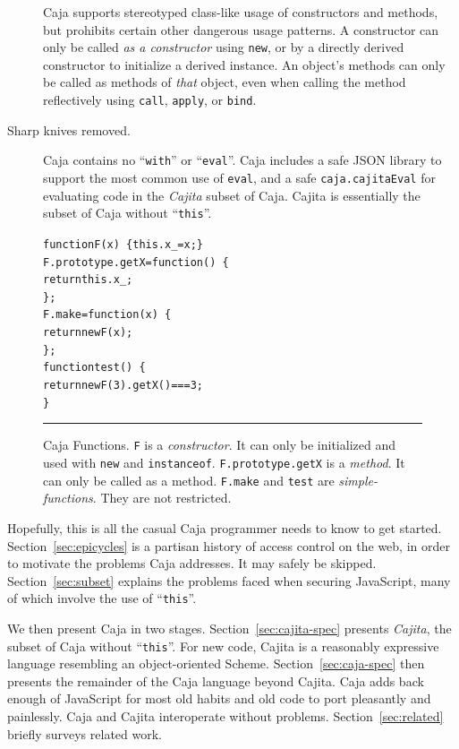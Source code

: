 \documentclass[letterpaper,twocolumn,10pt]{article}
\newcommand{\code}[1]{{\tt {#1}}}              %
\begin{document}
\begin{description}
  Caja supports stereotyped class-like usage of constructors and methods, but 
  prohibits certain other dangerous usage patterns. A constructor can only be 
  called \emph{as a constructor} using \code{new}, or by a directly derived 
  constructor to initialize a derived instance. An object's methods can only 
  be called as methods of \emph{that} object, even when calling the method 
  reflectively using \code{call}, \code{apply}, or \code{bind}.
 
  \item[Sharp knives removed.] Caja contains no ``\code{with}'' or 
  ``\code{eval}''. Caja includes a safe JSON library to support the most 
  common use of \code{eval}, and a safe \code{caja.cajitaEval} for evaluating code 
  in the \emph{Cajita} subset of Caja. Cajita is essentially the subset of 
  Caja without ``\code{this}''.
 
\end{description}

\begin{figure}[t!]
\begin{alltt}
function F(x)\ \{ this.x_ = x; \}
F.prototype.getX = function()\ \{
  return this.x_;
\};
F.make = function(x)\ \{
  return new F(x);
\};
function test()\ \{
  return new F(3).getX() === 3;
\}
\end{alltt}

\caption[Caja Functions]{Caja Functions. \code{F} is a \emph{constructor}. It 
can only be initialized and used with \code{new} and \code{instanceof}. 
\code{F.prototype.getX} is a \emph{method}. It can only be called as a 
method. \code{F.make} and \code{test} are \emph{simple-functions}. They are
not restricted. \\ } \hrule
\label{fig:func-obj}
\end{figure}

Hopefully, this is all the casual Caja programmer needs to know to get 
started. Section~\ref{sec:epicycles} is a partisan history of access control 
on the web, in order to motivate the problems Caja addresses. It may safely 
be skipped. Section~\ref{sec:subset} explains the problems faced when 
securing JavaScript, many of which involve the use of ``\code{this}''.

We then present Caja in two stages. Section~\ref{sec:cajita-spec} presents 
\emph{Cajita}, the subset of Caja without ``\code{this}''. For new code, 
Cajita is a reasonably expressive language resembling an object-oriented 
Scheme. Section~\ref{sec:caja-spec} then presents the remainder of the Caja 
language beyond Cajita. Caja adds back enough of JavaScript for most old 
habits and old code to port pleasantly and painlessly. Caja and Cajita 
interoperate without problems. Section~\ref{sec:related} briefly 
surveys related work.
\end{document}
